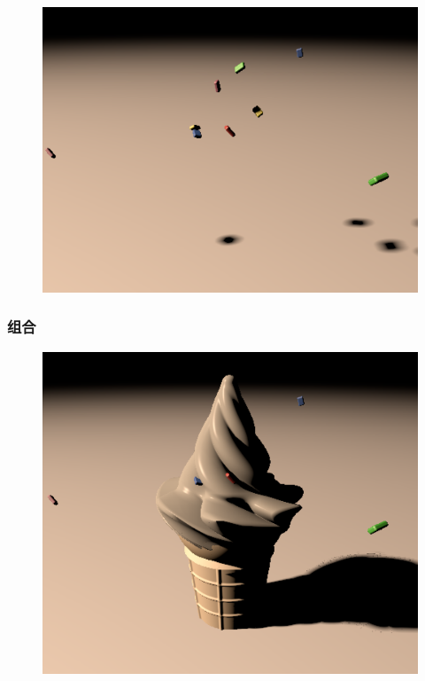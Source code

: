 \documentclass[aspectratio=169]{ctexbeamer} %
\begin{document}
\begin{frame}
\begin{figure}[htbp]
        \includegraphics[height=.47\textheight]{images/pre/material/candies.pdf}
        \caption{}
        \label{fig:material_splitted}
    \end{figure}
\end{frame}
\begin{frame}
    \frametitle{组合}
    \begin{figure}[htbp]
        \centering
        \includegraphics[height=.75\textheight]{images/pre/material/final.pdf}
        \caption{}
        \label{fig:material}
    \end{figure}
\end{frame}
\end{document}
